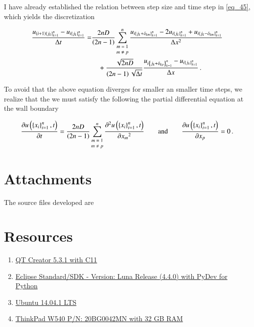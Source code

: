 \documentclass[11pt,english,a4paper]{article}
\begin{document}
\begin{flushleft}
I have already established the relation between step size and time step in \eqref{eq_45}, which yields the discretization

\begin{align*}
\frac{u_{(i+1)\left\lbrace{j_k}\right\rbrace_{k=1}^n}-u_{i\left\lbrace{j_k}\right\rbrace_{k=1}^n}}{\Delta t} =& \frac{2n D}{\left({2n-1}\right)}\sum_{\scriptsize\begin{matrix}m=1\\ m\neq p\end{matrix}}^n\frac{u_{i\left\lbrace{j_k+\delta_{km}}\right\rbrace_{k=1}^n} - 2 u_{i\left\lbrace{j_k}\right\rbrace_{k=1}^n} + u_{i\left\lbrace{j_k-\delta_{km}}\right\rbrace_{k=1}^n}}{\Delta x^2} 
\\&\quad + \frac{\sqrt{2nD}}{\left({2n-1}\right)\sqrt{\Delta t}} \frac{u_{i\left\lbrace{j_k+\delta_{kp}}\right\rbrace_{k=1}^n} - u_{i\left\lbrace{j_k}\right\rbrace_{k=1}^n}}{\Delta x} \,.
\end{align*}

To avoid that the above equation diverges for smaller an smaller time steps, we realize that the we must satisfy the following the partial differential equation at the wall boundary

\begin{align}
\frac{\partial u\left({\left\lbrace{x_i}\right\rbrace_{i=1}^n, t}\right)}{\partial t} = \frac{2n D}{\left({2n-1}\right)}\sum_{\scriptsize\begin{matrix}m=1\\ m\neq p\end{matrix}}^n \frac{\partial^2 u\left({\left\lbrace{x_i}\right\rbrace_{i=1}^n, t}\right)}{\partial {x_m}^2} \qquad \text{and} \qquad \frac{\partial u\left({\left\lbrace{x_i}\right\rbrace_{i=1}^n, t}\right)}{\partial x_p} = 0 \,.
\label{eq_50}
\end{align}

\section{Attachments}

The source files developed are


\section{Resources}

\begin{enumerate}
\item{\href{http://qt-project.org/downloads}{QT Creator 5.3.1 with C11}}
\item{\href{https://www.eclipse.org/downloads/}{Eclipse Standard/SDK  - Version: Luna Release (4.4.0) with PyDev for Python}}
\item{\href{http://www.ubuntu.com/download/desktop}{Ubuntu 14.04.1 LTS}}
\item{\href{http://shop.lenovo.com/no/en/laptops/thinkpad/w-series/w540/#tab-reseller}{ThinkPad W540 P/N: 20BG0042MN with 32 GB RAM}}
\end{enumerate}


\end{flushleft}
\end{document}
